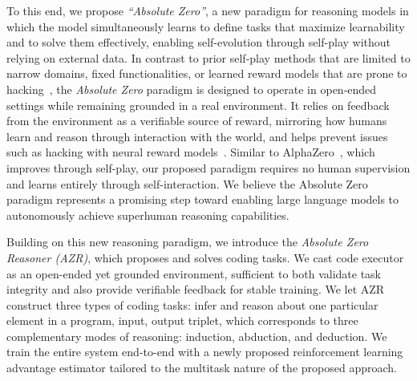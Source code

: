 \documentclass{article}
\begin{document}
To this end, we propose \emph{``Absolute Zero''}, a new paradigm for reasoning models in which the model simultaneously learns to define tasks that maximize learnability and to solve them effectively, enabling self-evolution through self-play without relying on external data. In contrast to prior self-play methods that are limited to narrow domains, fixed functionalities, or learned reward models that are prone to hacking~\citep{silver2017mastering, chen2025spcevolvingselfplaycritic, chen2024self}, the \emph{Absolute Zero} paradigm is designed to operate in open-ended settings while remaining grounded in a real environment. It relies on feedback from the environment as a verifiable source of reward, mirroring how humans learn and reason through interaction with the world, and helps prevent issues such as hacking with neural reward models~\citep{hughes2024open}. Similar to AlphaZero~\citep{silver2017mastering}, which improves through self-play, our proposed paradigm requires no human supervision and learns entirely through self-interaction. We believe the Absolute Zero paradigm represents a promising step toward enabling large language models to autonomously achieve superhuman reasoning capabilities.

Building on this new reasoning paradigm, we introduce the \emph{Absolute Zero Reasoner (AZR)}, which proposes and solves coding tasks. We cast code executor as an open-ended yet grounded environment, sufficient to both validate task integrity and also provide verifiable feedback for stable training. We let AZR construct three types of coding tasks: infer and reason about one particular element in a program, input, output triplet, which corresponds to three complementary modes of reasoning: induction, abduction, and deduction. We train the entire system end-to-end with a newly proposed reinforcement learning advantage estimator tailored to the multitask nature of the proposed approach.
\end{document}
